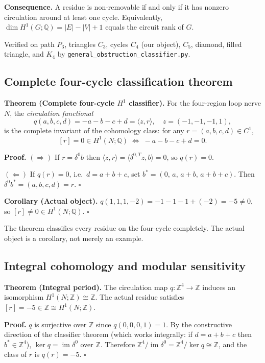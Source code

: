 \textbf{Consequence.}
A residue is non-removable if and only if it has nonzero circulation around at
least one cycle. Equivalently, $\dim H^1(G;\mathbb{Q})=|E|-|V|+1$ equals the
circuit rank of $G$.

Verified on path $P_3$, triangles $C_3$, cycles $C_4$ (our object), $C_5$,
diamond, filled triangle, and $K_4$ by \texttt{general\_obstruction\_classifier.py}.

\subsection{Complete four-cycle classification theorem}

\textbf{Theorem (Complete four-cycle $H^1$ classifier).}
For the four-region loop nerve $N$, the \emph{circulation functional}
\[
q(a,b,c,d) = -a-b-c+d = \langle z, r\rangle, \quad z=(-1,-1,-1,1),
\]
is the complete invariant of the cohomology class: for any $r=(a,b,c,d)\in C^1$,
\[
[r]=0\in H^1(N;\mathbb{Q})
\;\Longleftrightarrow\;
-a-b-c+d=0.
\]

\textbf{Proof.}
$(\Rightarrow)$ If $r=\delta^0 b$ then $\langle z,r\rangle=\langle\delta^{0,T}z,b\rangle=0$, so $q(r)=0$.

$(\Leftarrow)$ If $q(r)=0$, i.e.\ $d=a+b+c$, set
$b^*=(0,\,a,\,a+b,\,a+b+c)$.
Then $\delta^0 b^* = (a,b,c,d)=r$. $\square$

\textbf{Corollary (Actual object).}
$q(1,1,1,-2)=-1-1-1+(-2)=-5\neq 0$, so $[r]\neq 0\in H^1(N;\mathbb{Q})$. $\square$

The theorem classifies every residue on the four-cycle completely.
The actual object is a corollary, not merely an example.

\subsection{Integral cohomology and modular sensitivity}

\textbf{Theorem (Integral period).}
The circulation map $q:\mathbb{Z}^4\to\mathbb{Z}$ induces an isomorphism
$H^1(N;\mathbb{Z})\cong\mathbb{Z}$.
The actual residue satisfies $[r]=-5\in\mathbb{Z}\cong H^1(N;\mathbb{Z})$.

\textbf{Proof.}
$q$ is surjective over $\mathbb{Z}$ since $q(0,0,0,1)=1$.
By the constructive direction of the classifier theorem (which works integrally:
if $d=a+b+c$ then $b^*\in\mathbb{Z}^4$), $\ker q=\operatorname{im}\delta^0$ over
$\mathbb{Z}$. Therefore $\mathbb{Z}^4/\operatorname{im}\delta^0=\mathbb{Z}^4/\ker
q\cong\mathbb{Z}$, and the class of $r$ is $q(r)=-5$. $\square$

